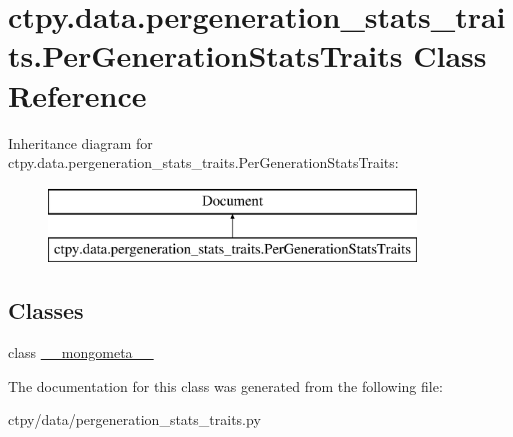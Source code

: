 \hypertarget{classctpy_1_1data_1_1pergeneration__stats__traits_1_1_per_generation_stats_traits}{\section{ctpy.\-data.\-pergeneration\-\_\-stats\-\_\-traits.\-Per\-Generation\-Stats\-Traits Class Reference}
\label{classctpy_1_1data_1_1pergeneration__stats__traits_1_1_per_generation_stats_traits}
}
Inheritance diagram for ctpy.\-data.\-pergeneration\-\_\-stats\-\_\-traits.\-Per\-Generation\-Stats\-Traits\-:\begin{figure}[H]
\begin{center}
\leavevmode
\includegraphics[height=2.000000cm]{classctpy_1_1data_1_1pergeneration__stats__traits_1_1_per_generation_stats_traits}
\end{center}
\end{figure}
\subsection*{Classes}
\begin{DoxyCompactItemize}
\item 
class \hyperlink{classctpy_1_1data_1_1pergeneration__stats__traits_1_1_per_generation_stats_traits_1_1____mongometa____}{\-\_\-\-\_\-mongometa\-\_\-\-\_\-}
\end{DoxyCompactItemize}


The documentation for this class was generated from the following file\-:\begin{DoxyCompactItemize}
\item 
ctpy/data/pergeneration\-\_\-stats\-\_\-traits.\-py\end{DoxyCompactItemize}
